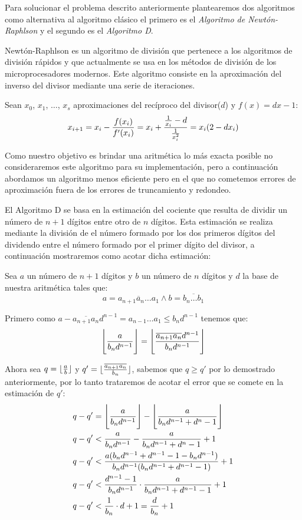 \documentclass[a4paper,10pt,twocolumn]{article}
\begin{document}
	Para solucionar el problema descrito anteriormente plantearemos dos algoritmos como alternativa al algoritmo clásico el primero es el \emph{Algoritmo de Newtón-Raphlson} y el segundo es el \emph{Algoritmo D}.
	
	Newtón-Raphlson es un algoritmo de división que pertenece a los algoritmos de división rápidos y que actualmente se usa en los métodos de división de los microprocesadores modernos. Este algoritmo consiste en la aproximación del inverso del divisor mediante una serie de iteraciones.
	
	Sean $x_0$, $x_1$, $\ldots$, $x_s$ aproximaciones del recíproco del divisor($d$) y $f(x)=dx-1$:
	\begin{equation}
		x_{i+1}=x_i-{f(x_i)\over f'(x_i)}=x_i+{{1\over x_i}-d\over{1\over x^2_i}} =x_i(2-dx_i)
	\end{equation}
	
	Como nuestro objetivo es brindar una aritmética lo más exacta posible no consideraremos este algoritmo para su implementación, pero a continuación abordamos un algoritmo menos eficiente pero en el que no cometemos errores de aproximación fuera de los errores de truncamiento y redondeo.
	
	El Algoritmo D se basa en la estimación del cociente que resulta de dividir un número de $n+1$ dígitos entre otro de $n$ dígitos. Esta estimación se realiza mediante la división de el número formado por los dos primeros dígitos del dividendo entre el número formado por el primer dígito del divisor, a continuación mostraremos como acotar dicha estimación:
	
	Sea $a$ un número de $n+1$ dígitos y $b$ un número de $n$ dígitos y $d$ la base de nuestra aritmética tales que:
		$$a=\overline{a_{n+1}a_n\ldots a_1} \wedge b=\overline{b_n\ldots b_1}$$	 
	
	Primero como $a-\overline{a_{n+1}a_n} d^{n-1}= a_{n-1}\ldots a_1\leq b_n d^{n-1}$ tenemos que:
	\begin{equation}
		\Bigg\lfloor{a \over b_nd^{n-1}}\Bigg\rfloor = \Bigg\lfloor{\overline{a_{n+1}a_n} d^{n-1} \over b_n d^{n-1}}\Bigg\rfloor
	\end{equation}
	
	Ahora sea $q=\lfloor{a \over b}\rfloor$ y $q'=\lfloor{\overline{a_{n+1}a_n} \over b_n}\rfloor$, sabemos que $q\geq q'$ por lo demostrado anteriormente, por lo tanto trataremos de acotar el error que se comete en la estimación de $q'$:
	\begin{equation}
		\begin{split}
			&q-q'=\Bigg\lfloor{a \over b_n d^{n-1}}\Bigg\rfloor-\Bigg\lfloor{a \over b_n d^{n-1}+d^n-1}\Bigg\rfloor\\ 
			&q-q'<{a \over b_n d^{n-1}}-{a \over b_n d^{n-1}+d^n-1}+1\\
			&q-q'<{a(b_n d^{n-1}+d^{n-1}-1-b_n d^{n-1})\over b_n d^{n-1}(b_n d^{n-1}+d^{n-1}-1)}+1\\
			&q-q'<{d^{n-1}-1\over b_n d^{n-1}}\cdot {a
\over b_n d^{n-1}+d^{n-1}-1}+1\\
			&q-q'<{1\over b_n}\cdot d+1={d\over b_n}+1
		\end{split}
	\end{equation}
	
\end{document}
